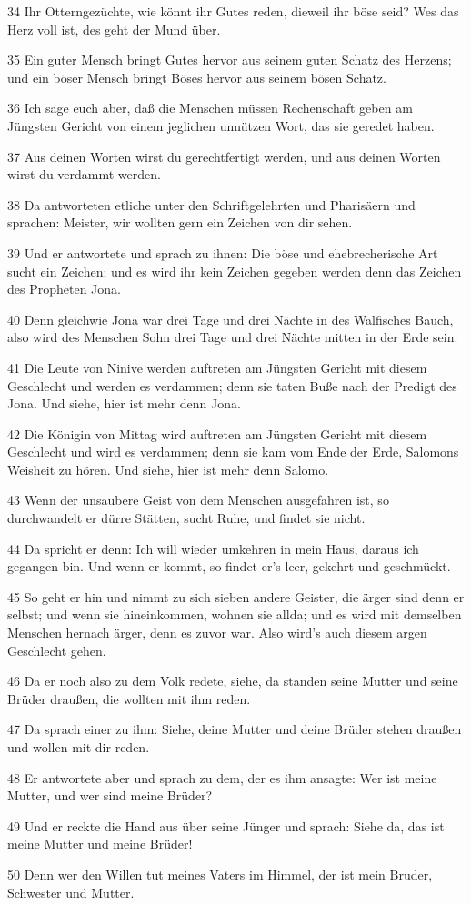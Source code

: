 \par 34 Ihr Otterngezüchte, wie könnt ihr Gutes reden, dieweil ihr böse seid? Wes das Herz voll ist, des geht der Mund über.
\par 35 Ein guter Mensch bringt Gutes hervor aus seinem guten Schatz des Herzens; und ein böser Mensch bringt Böses hervor aus seinem bösen Schatz.
\par 36 Ich sage euch aber, daß die Menschen müssen Rechenschaft geben am Jüngsten Gericht von einem jeglichen unnützen Wort, das sie geredet haben.
\par 37 Aus deinen Worten wirst du gerechtfertigt werden, und aus deinen Worten wirst du verdammt werden.
\par 38 Da antworteten etliche unter den Schriftgelehrten und Pharisäern und sprachen: Meister, wir wollten gern ein Zeichen von dir sehen.
\par 39 Und er antwortete und sprach zu ihnen: Die böse und ehebrecherische Art sucht ein Zeichen; und es wird ihr kein Zeichen gegeben werden denn das Zeichen des Propheten Jona.
\par 40 Denn gleichwie Jona war drei Tage und drei Nächte in des Walfisches Bauch, also wird des Menschen Sohn drei Tage und drei Nächte mitten in der Erde sein.
\par 41 Die Leute von Ninive werden auftreten am Jüngsten Gericht mit diesem Geschlecht und werden es verdammen; denn sie taten Buße nach der Predigt des Jona. Und siehe, hier ist mehr denn Jona.
\par 42 Die Königin von Mittag wird auftreten am Jüngsten Gericht mit diesem Geschlecht und wird es verdammen; denn sie kam vom Ende der Erde, Salomons Weisheit zu hören. Und siehe, hier ist mehr denn Salomo.
\par 43 Wenn der unsaubere Geist von dem Menschen ausgefahren ist, so durchwandelt er dürre Stätten, sucht Ruhe, und findet sie nicht.
\par 44 Da spricht er denn: Ich will wieder umkehren in mein Haus, daraus ich gegangen bin. Und wenn er kommt, so findet er's leer, gekehrt und geschmückt.
\par 45 So geht er hin und nimmt zu sich sieben andere Geister, die ärger sind denn er selbst; und wenn sie hineinkommen, wohnen sie allda; und es wird mit demselben Menschen hernach ärger, denn es zuvor war. Also wird's auch diesem argen Geschlecht gehen.
\par 46 Da er noch also zu dem Volk redete, siehe, da standen seine Mutter und seine Brüder draußen, die wollten mit ihm reden.
\par 47 Da sprach einer zu ihm: Siehe, deine Mutter und deine Brüder stehen draußen und wollen mit dir reden.
\par 48 Er antwortete aber und sprach zu dem, der es ihm ansagte: Wer ist meine Mutter, und wer sind meine Brüder?
\par 49 Und er reckte die Hand aus über seine Jünger und sprach: Siehe da, das ist meine Mutter und meine Brüder!
\par 50 Denn wer den Willen tut meines Vaters im Himmel, der ist mein Bruder, Schwester und Mutter.

